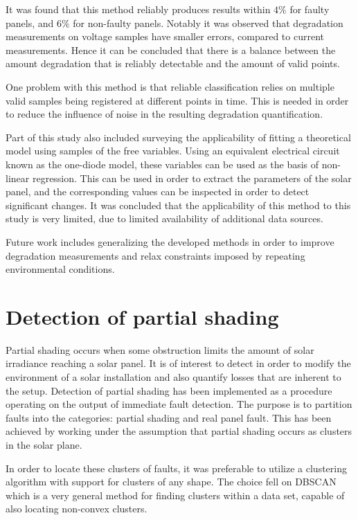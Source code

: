 It was found that this method reliably produces results within $4\%$ for faulty panels, and $6\%$ for non-faulty panels.
Notably it was observed that degradation measurements on voltage samples have smaller errors, compared to current measurements.
Hence it can be concluded that there is a balance between the amount degradation that is reliably detectable and the amount of valid points.

One problem with this method is that reliable classification relies on multiple valid samples being registered at different points in time.
This is needed in order to reduce the influence of noise in the resulting degradation quantification.

Part of this study also included surveying the applicability of fitting a theoretical model using samples of the free variables.
Using an equivalent electrical circuit known as the one-diode model, these variables can be used as the basis of non-linear regression.
This can be used in order to extract the parameters of the solar panel, and the corresponding values can be inspected in order to detect significant changes.
It was concluded that the applicability of this method to this study is very limited, due to limited availability of additional data sources.

Future work includes generalizing the developed methods in order to improve degradation measurements and relax constraints imposed by repeating environmental conditions.

\section{Detection of partial shading}
Partial shading occurs when some obstruction limits the amount of solar irradiance reaching a solar panel.
It is of interest to detect in order to modify the environment of a solar installation and also quantify losses that are inherent to the setup.
Detection of partial shading has been implemented as a procedure operating on the output of immediate fault detection.
The purpose is to partition faults into the categories: partial shading and real panel fault.
This has been achieved by working under the assumption that partial shading occurs as clusters in the solar plane.

In order to locate these clusters of faults, it was preferable to utilize a clustering algorithm with support for clusters of any shape.
The choice fell on DBSCAN which is a very general method for finding clusters within a data set, capable of also locating non-convex clusters.

